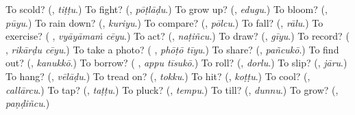\begin{tcolorbox}[breakable,colback=teal!4,colframe=teal!35!black,title={Before you move on}]
To scold? (\textbf{}, \emph{tiṭṭu}.) To fight? (\textbf{}, \emph{pōṭlāḍu}.) To grow up? (\textbf{}, \emph{edugu}.) To bloom? (\textbf{}, \emph{pūyu}.) To rain down? (\textbf{}, \emph{kuriyu}.) To compare? (\textbf{}, \emph{pōlcu}.) To fall? (\textbf{}, \emph{rālu}.) To exercise? (\textbf{ }, \emph{vyāyāmaṁ cēyu}.) To act? (\textbf{}, \emph{naṭiñcu}.) To draw? (\textbf{}, \emph{gīyu}.) To record? (\textbf{ }, \emph{rikārḍu cēyu}.) To take a photo? (\textbf{ }, \emph{phōṭō tīyu}.) To share? (\textbf{}, \emph{pañcukō}.) To find out? (\textbf{}, \emph{kanukkō}.) To borrow? (\textbf{ }, \emph{appu tīsukō}.) To roll? (\textbf{}, \emph{dorlu}.) To slip? (\textbf{}, \emph{jāru}.) To hang? (\textbf{}, \emph{vēlāḍu}.) To tread on? (\textbf{}, \emph{tokku}.) To hit? (\textbf{}, \emph{koṭṭu}.) To cool? (\textbf{}, \emph{callārcu}.) To tap? (\textbf{}, \emph{taṭṭu}.) To pluck? (\textbf{}, \emph{tempu}.) To till? (\textbf{}, \emph{dunnu}.) To grow? (\textbf{}, \emph{paṇḍiñcu}.)
\end{tcolorbox}

